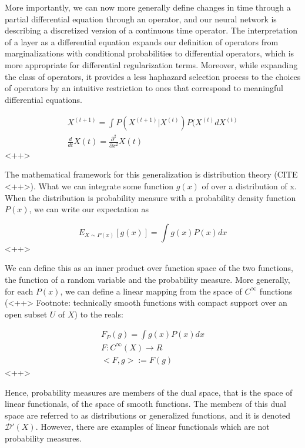 \documentclass[a4paper]{article}
\begin{document}
More importantly, we can now more generally define changes in time through a partial differential equation through an operator, and our neural network is describing a discretized version of a continuous time operator. 
The interpretation of a layer as a differential equation expands our definition of operators from marginalizations with conditional probabilities to differential operators, which is more appropriate for differential regularization terms. 
Moreover, while expanding the class of operators, it provides a less haphazard selection process to the choices of operators by an intuitive restriction to ones that correspond to meaningful differential equations.

\begin{equation}
  \begin{split}
    X^{(t+1)} = \int P( X^{(t+1)} \vert X^{(t)} ) P(X^{(t)} dX^{(t)} \\
    \frac{d}{dt}X(t) = \frac{\partial^2}{\partial x^2} X(t)
  \end{split}
  \label{<++>}
\end{equation}<++>

The mathematical framework for this generalization is distribution theory (CITE <++>). 
What we can integrate some function $g(x)$ of over a distribution of x. 
When the distribution is probability measure with a probability density function $P(x)$, we can write our expectation as

\begin{equation}
  E_{X \sim P(x)} \left[ g(x) \right] = \int g(x) P(x) dx
  \label{<++>}
\end{equation}<++>

We can define this as an inner product over function space of the two functions, the function of a random variable and the probability measure. 
More generally, for each $P(x)$, we can define a linear mapping from the space of $C^{\infty}$ functions (<++> Footnote: technically smooth functions with compact support over an open subset $U$ of $X$) to the reals:

\begin{equation}
  \begin{split}
    F_P(g) = \int g(x) P(x) dx \\
    F: C^{\infty}(X) \rightarrow R \\
    <F, g> := F(g)
  \end{split}
  \label{<++>}
\end{equation}<++>

Hence, probability measures are members of the dual space, that is the space of linear functionals, of the space of smooth functions. 
The members of this dual space are referred to as distributions or generalized functions, and it is denoted $\mathcal{D}'(X)$.
However, there are examples of linear functionals which are not probability measures. 
\end{document}
